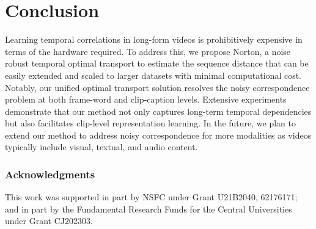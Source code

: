 \section{Conclusion}
\label{sec:conclusion}

Learning temporal correlations in long-form videos is prohibitively expensive in terms of the hardware required. To address this, we propose Norton, a noise robust temporal optimal transport to estimate the sequence distance that can be easily extended and scaled to larger datasets with minimal computational cost.
Notably, our unified optimal transport solution resolves the noisy correspondence problem at both frame-word and clip-caption levels. Extensive experiments demonstrate that our method not only captures long-term temporal dependencies but also facilitates clip-level representation learning.
In the future, we plan to extend our method to address noisy correspondence for more modalities as videos typically include visual, textual, and audio content. 

\subsubsection*{Acknowledgments}

This work was supported in part by NSFC under Grant U21B2040, 62176171; and in part by the Fundamental Research Funds for the Central Universities under Grant CJ202303.

\newpage

